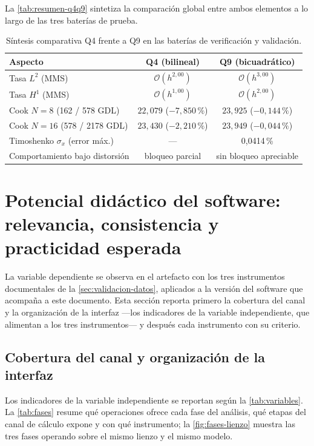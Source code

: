 La \autoref{tab:resumen-q4q9} sintetiza la comparación global entre ambos elementos a lo largo de las tres baterías de prueba.

\begin{table}[htbp]
\centering
\caption{Síntesis comparativa Q4 frente a Q9 en las baterías de verificación y validación.}
\label{tab:resumen-q4q9}
\begin{tabular}{l c c}
\hline
Aspecto & Q4 (bilineal) & Q9 (bicuadrático) \\
\hline
Tasa $L^2$ (MMS)              & $\mathcal{O}(h^{2{,}00})$ & $\mathcal{O}(h^{3{,}00})$ \\
Tasa $H^1$ (MMS)              & $\mathcal{O}(h^{1{,}00})$ & $\mathcal{O}(h^{2{,}00})$ \\
Cook $N=8$ (162 / 578 GDL)    & $22{,}079$ ($-7{,}850\,\%$) & $23{,}925$ ($-0{,}144\,\%$) \\
Cook $N=16$ (578 / 2178 GDL)  & $23{,}430$ ($-2{,}210\,\%$) & $23{,}949$ ($-0{,}044\,\%$) \\
Timoshenko $\sigma_x$ (error máx.) & --- & 0,0414\,\% \\
Comportamiento bajo distorsión & bloqueo parcial & sin bloqueo apreciable \\
\hline
\end{tabular}
{\singlespacing{}}
\end{table}

\section{Potencial didáctico del software: relevancia, consistencia y practicidad esperada}
\label{sec:cobertura}

La variable dependiente se observa en el artefacto con los tres instrumentos documentales de la \autoref{sec:validacion-datos}, aplicados a la versión del software que acompaña a este documento. Esta sección reporta primero la cobertura del canal y la organización de la interfaz —los indicadores de la variable independiente, que alimentan a los tres instrumentos— y después cada instrumento con su criterio.

\subsection{Cobertura del canal y organización de la interfaz}
\label{sec:cobertura-canal}

Los indicadores de la variable independiente se reportan según la \autoref{tab:variables}. La \autoref{tab:fases} resume qué operaciones ofrece cada fase del análisis, qué etapas del canal de cálculo expone y con qué instrumento; la \autoref{fig:fases-lienzo} muestra las tres fases operando sobre el mismo lienzo y el mismo modelo.


